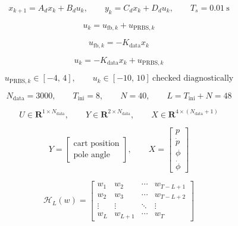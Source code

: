 \[
x_{k+1}=A_d x_k+B_d u_k,
\qquad
y_k=C_d x_k+D_d u_k,
\qquad
T_s=0.01~\mathrm{s}
\]

%

\[
u_k = u_{\mathrm{fb},k}+u_{\mathrm{PRBS},k}
\]

\[
u_{\mathrm{fb},k}=-K_{\mathrm{data}}x_k
\]

\[
\boxed{
u_k=-K_{\mathrm{data}}x_k+u_{\mathrm{PRBS},k}
}
\]

\[
u_{\mathrm{PRBS},k}
\in
\left[-4,\,4\right],
\qquad
u_k \in \left[-10,\,10\right]\ \text{checked diagnostically}
\]


\[
N_{\mathrm{data}}=3000,
\qquad
T_{\mathrm{ini}}=8,
\qquad
N=40,
\qquad
L=T_{\mathrm{ini}}+N=48
\]

\[
U \in \mathbf{R}^{1\times N_{\mathrm{data}}},
\qquad
Y \in \mathbf{R}^{2\times N_{\mathrm{data}}},
\qquad
X \in \mathbf{R}^{4\times(N_{\mathrm{data}}+1)}
\]

\[
Y=
\begin{bmatrix}
\text{cart position}\\
\text{pole angle}
\end{bmatrix},
\qquad
X=
\begin{bmatrix}
p\\ \dot p\\ \phi\\ \dot \phi
\end{bmatrix}
\]


\[
\mathcal{H}_L(w)=
\begin{bmatrix}
w_1 & w_2 & \cdots & w_{T-L+1}\\
w_2 & w_3 & \cdots & w_{T-L+2}\\
\vdots & \vdots & \ddots & \vdots\\
w_L & w_{L+1} & \cdots & w_T
\end{bmatrix}
\]

